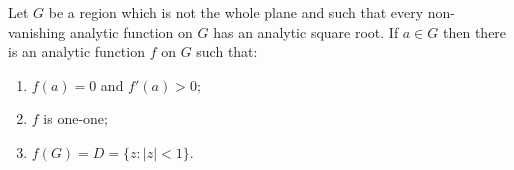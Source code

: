 Let $G$ be a region which is not the whole plane and such that every non-vanishing analytic function on $G$ has an analytic square root. If $a \in G$ then there is an analytic function $f$ on $G$ such that:
\begin{enumerate}
\item[(a)] $f(a) = 0$ and $f'(a) > 0$;
\item[(b)] $f$ is one-one;
\item[(c)] $f(G) = D = \{z : |z| < 1\}$.
\end{enumerate}
